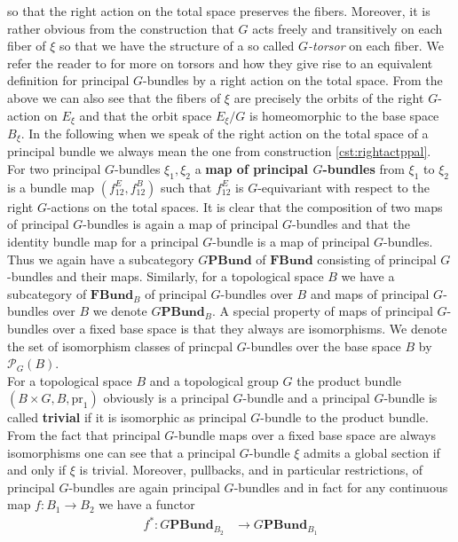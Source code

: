 so that the right action on the total space preserves the fibers. Moreover, it is rather obvious from the construction that $G$ acts freely and transitively on each fiber of $\xi$ so that we have the structure of a so called \textit{$G$-torsor} on each fiber. We refer the reader to \cite{00000001} for more on torsors and how they give rise to an equivalent definition for principal $G$-bundles by a right action on the total space. From the above we can also see that the fibers of $\xi$ are precisely the orbits of the right $G$-action on $E_{\xi}$ and that the orbit space $E_{\xi}/G$ is homeomorphic to the base space $B_{\xi}$. In the following when we speak of the right action on the total space of a principal bundle we always mean the one from construction \ref{cst:rightactppal}.
\\
For two principal $G$-bundles $\xi_{1},\xi_{2}$ a \textbf{map of principal $G$-bundles} from $\xi_{1}$ to $\xi_{2}$ is a bundle map $(f_{12}^{E},f_{12}^{B})$ such that $f_{12}^{E}$ is $G$-equivariant with respect to the right $G$-actions on the total spaces. It is clear that the composition of two maps of principal $G$-bundles is again a map of principal $G$-bundles and that the identity bundle map for a principal $G$-bundle is a map of principal $G$-bundles. Thus we again have a subcategory $G\mathbf{PBund}$ of $\mathbf{FBund}$ consisting of principal $G$-bundles and their maps. Similarly, for a topological space $B$ we have a subcategory of $\mathbf{FBund}_{B}$ of principal $G$-bundles over $B$ and maps of principal $G$-bundles over $B$ we denote $G\mathbf{PBund}_{B}$. A special property of maps of principal $G$-bundles over a fixed base space is that they always are isomorphisms. We denote the set of isomorphism classes of princpal $G$-bundles over the base space $B$ by $\mathcal{P}_{G}(B)$.
\\
For a topological space $B$ and a topological group $G$ the product bundle $(B \times G,B,\mathrm{pr}_{1})$ obviously is a principal $G$-bundle and a principal $G$-bundle is called \textbf{trivial} if it is isomorphic as principal $G$-bundle to the product bundle. From the fact that principal $G$-bundle maps over a fixed base space are always isomorphisms one can see that a principal $G$-bundle $\xi$ admits a global section if and only if $\xi$ is trivial. Moreover, pullbacks, and in particular restrictions, of principal $G$-bundles are again principal $G$-bundles and in fact for any continuous map $f \colon B_{1} \to B_{2}$ we have a functor
\begin{align*}
  f^{\ast}
  \colon
  G\mathbf{PBund}_{B_{2}}
  &\to
  G\mathbf{PBund}_{B_{1}}
\end{align*}
